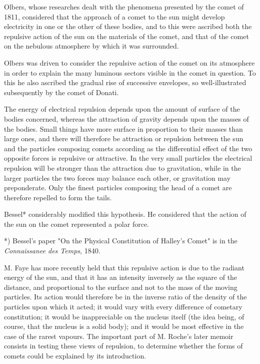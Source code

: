 \documentclass[a4paper, 12pt, oneside, polutonikogreek, english]{article}
\begin{document}
Olbers, whose researches dealt with the phenomena presented by the comet of 1811, considered that the approach of a comet to the sun might develop electricity in one or the other of these bodies, and to this were ascribed both the repulsive action of the sun on the materials of the comet, and that of the comet on the nebulous atmosphere by which it was surrounded.

Olbers was driven to consider the repulsive action of the comet on its atmosphere in order to explain the many luminous sectors visible in the comet in question. To this he also ascribed the gradual rise of successive envelopes, so well-illustrated subsequently by the comet of Donati.

The energy of electrical repulsion depends upon the amount of surface of the bodies concerned, whereas the attraction of gravity depends upon the masses of the bodies. Small things have more surface in proportion to their masses than large ones, and there will therefore be attraction or repulsion between the sun and the particles composing comets according as the differential effect of the two opposite forces is repulsive or attractive. In the very small particles the electrical repulsion will be stronger than the attraction due to gravitation, while in the larger particles the two forces may balance each other, or gravitation may preponderate. Only the finest particles composing the head of a comet are therefore repelled to form the tails.

Bessel* considerably modified this hypothesis. He considered that the action of the sun on the comet represented a polar force.

*) Bessel's paper "On the Physical Constitution of Halley's Comet" is in the \emph{Connaissanee des Temps}, 1840.

M. Faye has more recently held that this repulsive action is due to the radiant energy of the sun, and that it has an intensity inversely as the square of the distance, and proportional to the surface and not to the mass of the moving particles. Its action would therefore be in the inverse ratio of the density of the particles upon which it acted; it would vary with every difference of cometary constitution; it would be inappreciable on the nucleus itself (the idea being, of course, that the nucleus is a solid body); and it would be most effective in the case of the rarest vapours. The important part of M. Roche's later memoir consists in testing these views of repulsion, to determine whether the forms of comets could be explained by its introduction.
\end{document}
